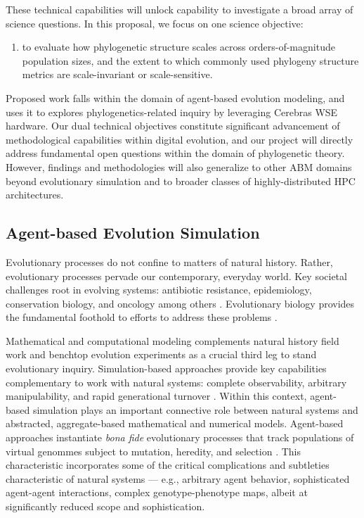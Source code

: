 These technical capabilities will unlock capability to investigate a broad array of science questions.
In this proposal, we focus on one science objective:
\begin{enumerate}
\item to evaluate how phylogenetic structure scales across orders-of-magnitude population sizes, and the extent to which commonly used phylogeny structure metrics are scale-invariant or scale-sensitive.
\end{enumerate}

Proposed work falls within the domain of agent-based evolution modeling, and uses it to explores phylogenetics-related inquiry by leveraging Cerebras WSE hardware.
Our dual technical objectives constitute significant advancement of methodological capabilities within digital evolution, and our project will directly address fundamental open questions within the domain of phylogenetic theory.
However, findings and methodologies will also generalize to other ABM domains beyond evolutionary simulation and to broader classes of highly-distributed HPC architectures.

\subsection{Agent-based Evolution Simulation}

Evolutionary processes do not confine to matters of natural history.
Rather, evolutionary processes pervade our contemporary, everyday world.
Key societal challenges root in evolving systems: antibiotic resistance, epidemiology, conservation biology, and oncology among others \citep{TODO, TODO}.
Evolutionary biology provides the fundamental foothold to efforts to address these problems \citep{evolutionasbaseforoncology}.

Mathematical and computational modeling complements natural history field work and benchtop evolution experiments as a crucial third leg to stand evolutionary inquiry.
Simulation-based approaches provide key capabilities complementary to work with natural systems: complete observability, arbitrary manipulability, and rapid generational turnover \citep{pennock}.
Within this context, agent-based simulation plays an important connective role between natural systems and abstracted, aggregate-based mathematical and numerical models.
Agent-based approaches instantiate \textit{bona fide} evolutionary processes that track populations of virtual genommes subject to mutation, heredity, and selection \citep{pennnock}.
This characteristic incorporates some of the critical complications and subtleties characteristic of natural systems --- e.g., arbitrary agent behavior, sophisticated agent-agent interactions, complex genotype-phenotype maps, albeit at significantly reduced scope and sophistication.

